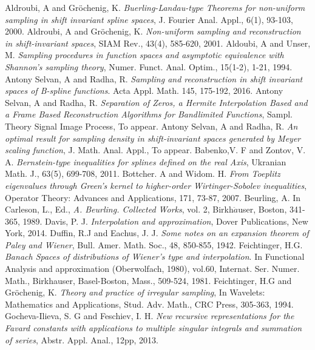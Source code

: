 \documentclass[a4paper,12pt,reqno]{amsart}
\theoremstyle{plain}
\numberwithin{equation}{section}
\theoremstyle{definition}
\begin{document}
\begin{thebibliography}{150}
 Aldroubi, A and Gr\"{o}chenig, K. \emph{Buerling-Landau-type Theorems for non-uniform sampling in shift invariant spline spaces}, J. Fourier Anal. Appl., 6(1), 93-103, 2000.
 Aldroubi, A and Gr\"{o}chenig, K. \emph{Non-uniform sampling and
reconstruction in shift-invariant spaces}, SIAM Rev., 43(4), 585-620, 2001.
 Aldoubi, A and Unser, M. \emph{Sampling procedures in function spaces and asymptotic equivalence with Shannon's sampling theory}, Numer. Funct. Anal. Optim., 15(1-2), 1-21, 1994.
 Antony Selvan, A and Radha, R. \emph{Sampling and reconstruction in shift invariant spaces of B-spline functions}. Acta Appl. Math. 145, 175-192, 2016.
 Antony Selvan, A and Radha, R. \emph{Separation of Zeros, a Hermite Interpolation Based and a Frame
Based Reconstruction Algorithms for Bandlimited Functions}, Sampl. Theory Signal Image Process, To appear.
 Antony Selvan, A and Radha, R. \emph{An optimal result for sampling density in shift-invariant spaces generated by Meyer scaling function}, J. Math. Anal. Appl., To appear.
 Babenko,V. F and Zontov, V. A. \emph{Bernstein-type inequalities for splines defined on the real Axis}, Ukranian Math. J., 63(5), 699-708, 2011.
 B$\ddot{o}$ttcher. A and Widom. H. \emph{From Toeplitz eigenvalues through Green's kernel to higher-order Wirtinger-Sobolev inequalities}, Operator Theory: Advances and Applications, 171, 73-87, 2007.
 Beurling, A. In Carleson, L., Ed.,\emph{ A. Beurling. Collected Works}, vol. 2,  Birkh$\ddot{a}$user, Boston, 341-365, 1989.
 Davis, P. J. \emph{Interpolation and approximation}, Dover Publications, New York, 2014.
 Duffin, R.J and Eachus, J. J. \emph{Some notes on an expansion theorem of Paley and Wiener}, Bull. Amer. Math. Soc., 48, 850-855, 1942.
 Feichtinger, H.G. \emph{Banach Spaces of distributions of Wiener's type and interpolation}. In Functional Analysis and approximation (Oberwolfach, 1980), vol.60, Internat. Ser. Numer. Math., Birkhauser, Basel-Boston, 
Mass.,  509-524, 1981.
 Feichtinger, H.G and Gr\"{o}chenig, K. \emph{Theory and practice of irregular sampling}, In Wavelets: Mathematics and Applications, Stud. Adv. Math., CRC Press, 305-363, 1994.
 Gocheva-Ilieva, S. G and Feschiev, I. H. \emph{New recursive representations for the Favard constants with applications to multiple singular integrals and summation of series}, Abstr. Appl. Anal., 12pp, 2013.

\end{thebibliography}
\end{document}
